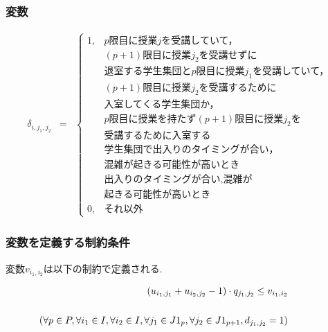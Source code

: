 \documentclass[dvipdfmx,12pt]{beamer}
\begin{document}
\begin{frame}
 \frametitle {\LARGE 変数}
\small{
\[
\begin{array}{rcl}

 \delta_{i,j_1,j_2} & = & \left\{ 
\begin{array}{ll}
1, & \mbox{$p$限目に授業$j$を受講していて，}\\
& \mbox{$(p+1)$限目に授業$j_2$を受講せずに}\\
& \mbox{退室する学生集団と$p$限目に授業$j_1$を受講していて，}\\
& \mbox{$(p+1)$限目に授業$j_2$を受講するために}\\
& \mbox{入室してくる学生集団か，}\\
& \mbox{$p$限目に授業を持たず$(p+1)$限目に授業$j_2$を}\\
& \mbox{受講するために入室する}\\
& \mbox{学生集団で出入りのタイミングが合い，}\\
& \mbox{混雑が起きる可能性が高いとき}\\
& \mbox{出入りのタイミングが合い,混雑が}\\
& \mbox{起きる可能性が高いとき}\\
0, & \mbox{それ以外}
\end{array}
\right.
\end{array}
\]
}
\end{frame}


\begin{frame}

  \frametitle{\LARGE 変数を定義する制約条件}



\vspace{5.0mm}


変数$v_{i_1,i_2}$は以下の制約で定義される.

{\Large
\begin{eqnarray}
\label{eqqq:seiyaku_first} 
&&( u_{i_1,j_1} + u_{i_2,j_2} - 1 ) \cdot q_{j_1,j_2} \leq v_{i_1,i_2}\\
\nonumber\\
&&\hspace{-15.0mm} \left(\forall p \in P,\forall i_1 \in I,\forall i_2 \in I,\forall j_1 \in J1_p,\forall j_2 \in J1_{p+1},d_{j_1,j_2}=1\right)\nonumber 
\end{eqnarray}
}


\end{frame}
\end{document}
